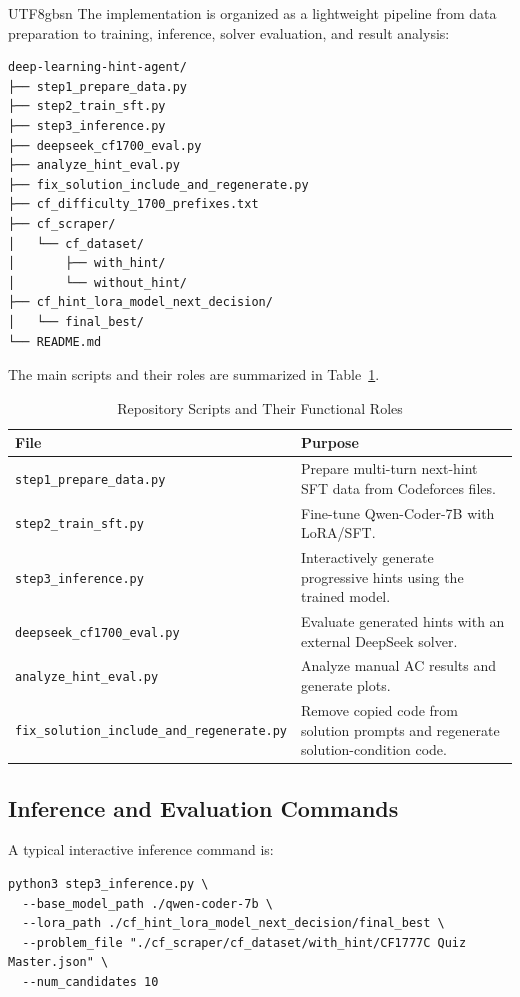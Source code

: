 \documentclass{article}
\begin{document}
\begin{CJK*}{UTF8}{gbsn}
The implementation is organized as a lightweight pipeline from data preparation to training, inference, solver evaluation, and result analysis:
\begin{verbatim}
deep-learning-hint-agent/
├── step1_prepare_data.py
├── step2_train_sft.py
├── step3_inference.py
├── deepseek_cf1700_eval.py
├── analyze_hint_eval.py
├── fix_solution_include_and_regenerate.py
├── cf_difficulty_1700_prefixes.txt
├── cf_scraper/
│   └── cf_dataset/
│       ├── with_hint/
│       └── without_hint/
├── cf_hint_lora_model_next_decision/
│   └── final_best/
└── README.md
\end{verbatim}

The main scripts and their roles are summarized in Table~\ref{tab:repo_scripts}.

\begin{table}[h]
  \caption{Repository Scripts and Their Functional Roles}
  \label{tab:repo_scripts}
  \centering
  \begin{tabular}{ll}
    \toprule
    File & Purpose \\
    \midrule
    \texttt{step1\_prepare\_data.py} & Prepare multi-turn next-hint SFT data from Codeforces files. \\
    \texttt{step2\_train\_sft.py} & Fine-tune Qwen-Coder-7B with LoRA/SFT. \\
    \texttt{step3\_inference.py} & Interactively generate progressive hints using the trained model. \\
    \texttt{deepseek\_cf1700\_eval.py} & Evaluate generated hints with an external DeepSeek solver. \\
    \texttt{analyze\_hint\_eval.py} & Analyze manual AC results and generate plots. \\
    \texttt{fix\_solution\_include\_and\_regenerate.py} & Remove copied code from solution prompts and regenerate solution-condition code. \\
    \bottomrule
  \end{tabular}
\end{table}

\subsection{Inference and Evaluation Commands}
A typical interactive inference command is:
\begin{verbatim}
python3 step3_inference.py \
  --base_model_path ./qwen-coder-7b \
  --lora_path ./cf_hint_lora_model_next_decision/final_best \
  --problem_file "./cf_scraper/cf_dataset/with_hint/CF1777C Quiz Master.json" \
  --num_candidates 10
\end{verbatim}


\end{CJK*}
\end{document}
